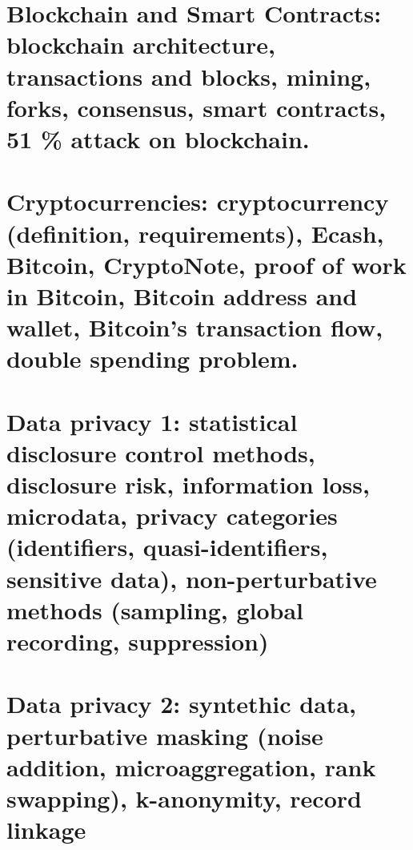\clearpage
\section{Blockchain and Smart Contracts: blockchain architecture, transactions and blocks, mining, forks, consensus, smart contracts, 51 \% attack on blockchain.}

\clearpage
\section{Cryptocurrencies: cryptocurrency (definition, requirements), Ecash, Bitcoin, CryptoNote, proof of work in Bitcoin, Bitcoin address and wallet, Bitcoin’s transaction flow, double spending problem.}

\clearpage
\section{Data privacy 1: statistical disclosure control methods, disclosure risk, information loss, microdata, privacy categories (identifiers, quasi-identifiers, sensitive data), non-perturbative methods (sampling, global recording, suppression)}

\clearpage
\section{Data privacy 2: syntethic data, perturbative masking (noise addition, microaggregation, rank swapping), k-anonymity, record linkage}
